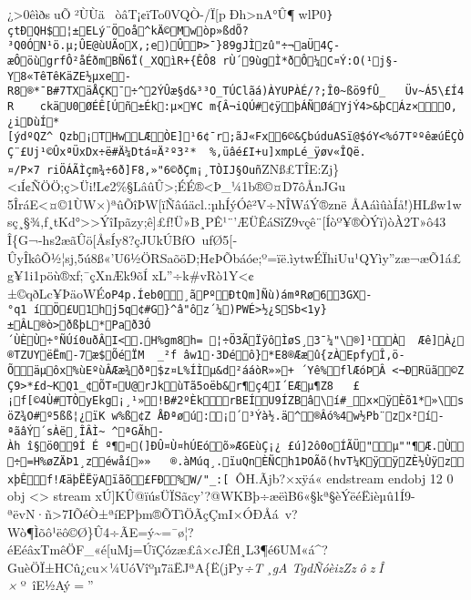 \documentclass[
]{article}
\begin{document}
{¿\textgreater0êìðsuÕ²ÙÙäòâT¡¢ïTo0VQÒ-/Ï{[}pÐh\textgreater nA°Û¶wlP0\texttt{\}çtÐQH\$¦±\textquotesingle{}ELý¨Öoå\^{}kÄ©Mwòp»ßdÕ?³Q0ÓN¹ö.µ;ÛE@ùUÃoX,;e)ÛÞ\textgreater{}¯\}89gJÌzû"÷¬aÜ4Ç­æÔöùgrfÔ²åÉðmBÑ6Ï(\_XQìR+\{ÊÔ8~rÙ´9ùgÌ*ðÔ¼C¤Ý:O(¹j§-Y8«TêTêKäZE½µxe-R8®*¯B\#7TXäÅÇK¯÷\^{}2ÝÛæ§d\&³³O\_TÚC\textbar{}lãá)ÀYUPÀÉ/?;Î0\textasciitilde{}ßö9fÛ\_\ \ \ Üv\textasciitilde{}Á5\textbackslash{}£Í4R\ \ \ \ ckäU0ØÉÊ{[}Úñ±Ék:µ×¥C\ m\{Â¬iQÚ\#¢ÿþÁÑØáYjÝ4\textgreater{}\&þCÁz×O,¿i\textbar{}DùÍ*{[}ýdºQZ\^{}\ Qzb¡THwLÆÒE{]}¹6¢¯r;ãJ«Fx6©\&ÇbúduASï@\$óY\textless{}\%ó7TººêæúËÇÒÇ¨£Uj­¹©ÛxªÜxDx÷ë\#Ä¼Dtá¤Ä²º\textquotesingle{}3²*\ \ \%,üâé£I+u{]}xmpLé\_ÿøv«ÎQë.¤/P×7\ riÖÁÃÌçm¾÷6ð{]}F8,»"6©ðÇm¡¸TÒIJ§Ouñ}ZNß£TÎE:Zj\}\textless{}\iÍ¢ÑÖÖ;ç\textgreater Üi!L¢2\%§LâûÛ\textgreater;ÉÉ®\textless Þ\_\textbar¼1b®©¤D7ôÅnJGu5ÎráE\textless¤©1ÙW×)ªûÕîÞW{[}ïÑâúäcl.:µhÍýÓê²V÷NÎWáÝ®znë ÅAáìûàÍå!)HLßw1wsç¸§¾,f¸tKd°\textgreater\textgreater ÝîIpãzy;ê{]}£f!Ü»B¸PÊ¹¨'ÆÜÊáSîZ9vçê¨{[}Íòº¥®ÒÝï)òÀ2T»ô43 Î\{G¬-hs2æãÛö{[}­ÅsÍy8?çJUkÚBfO~ufØ5{[}­ÛyÎkôÕ½¦sj,5ú8ß«'U6½ÖRSaõöD;H¢ÞÕbáóe;º=ïë.ìytwÉÏhiUu¹QYìy''zæ¬æÕ1á­£g¥1i1pöù®xf;¯çXnÆk9õÍ xL''÷k\é\#vRò1Y\textless¢±©qðLc¥ÞäoWÉ\texttt{oP4p.Íeb0¸ãPºÐtQm{]}Ñù)ámªRø63GX-°q1\  íÖ£U1hj5q¢\#G\}\^{}â"ôz´ ¼)PWÉ\textgreater{}½¿SSb­\textless{}1y\}±ÂL®ò\textgreater{}ðßþL*Pað3Ó´Ù\textbar{}ÈÙ÷°ÑÚí0uðÂI\textless{}.H\%gm8h =\ ¦÷Ö3ÃÏÿôÌøS¸3¯¼"\textbackslash{}®{]}¹À\ \ Æê{]}À¿®TZUY\textquotesingle{}ëËm-7æ\$ ÕéÏM\ \ \_²f\ âw1·3Déô\}*E8®Ææû\{zÀEpfyÎ,ö­Õäµôx\%ùEºùÂÆæ¾ðª\$z¤L\%ÍÌµ\&d²ááòR»»+\ ´Yê\%flÆóÞÂ~\textless{}¬Ð\textquotesingle{}Rüã©ZÇ9\textgreater{}*£d\textasciitilde{}KQ1\_¢ÕT¤U@rJkùTã5oëb\&r¶ç4I´EÆµ¶Z8\ \ \ £¡f{[}©4Ù\#TÒyEkg¡¸¹»!B\#2ºÈkrBEÍU9ÍZBâ\textbackslash{}í\#\_x×ÿÈõ1*»\textbackslash{}söZ¾O\#º5ß\textquotesingle{}ß¦¿ïK~w\%ß¢Z\textbar{}\ ÅÐªøú:¡´³Ýà½.ä\^{}®Âó\%4w½Pb¨zx²í-ªãâÝ´sÀë¸ÎÂÌ\textasciitilde{}~\^{}ªGÃh­Àh\ î§ö09Í\ É\ º¶¤({]}ÐÛ¤Ù¤hÚEóõ»ÆGEùÇ¡¿\ £ú{]}2ô0oÍÃÜ"µ""¶Æ.Ù÷=H\%øZÄÞ1¸zéwåí»»\ \ \ ®.àMúq¸.ïuQnÈÑCh1\textquotesingle{}ÞOÃõ(hvT¼KÿÿZÈ½ÙÿzxþÊf!ÆäþËËÿAïãõ£FÐ\%W/"\_:{[}~}ÔH.Ãjb?×xÿá«
endstream
endobj
12 0 obj
\textless{}\textgreater{}
stream
xÚ{]}KÛ@ïúsÜÏSãcy'?@WKBþ÷æëìB6«§kª§èÝëéËièµû1Í9-ªëvN·ñ\textgreater7IÕéÒ±ªíEPþm®ÕTìÖÃçÇmI×ÓÐÅá~v?Wò¶Ìõô¹ëô©Ø\}Û4÷ÃE=ý\textasciitilde=¯ø\textbar¦?éEéâxTmêÖF\_«é{[}uMj=ÚïÇózæ£â×cJÊfl¸L3¶é6UM«á\^{}?GuèÖÏ±HCû¿cu×¼UóVîºµ7äËJªA\{Ë(jPy\emph{÷T¸ gA TgdÑóèizZzôzÎ ×}º~îE½Aý=''
}
\end{document}
